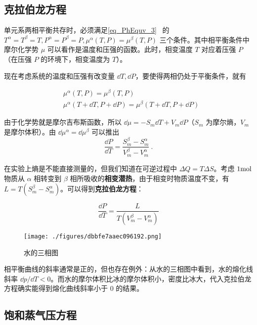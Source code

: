 
\begin{issues}
\issueDraft
\end{issues}


\subsection{克拉伯龙方程}
单元系两相平衡共存时，必须满足\autoref{eq_PhEquv_3}~ 的 $T^\alpha=T^\beta=T,P^\alpha=P^\beta=P,\mu^\alpha(T,P)=\mu^\beta(T,P)$ 三个条件。其中相平衡条件中摩尔化学势 $\mu$ 可以看作是温度和压强的函数。此时，相变温度 $T$ 对应着压强 $P$（在压强 $P$ 的环境下，相变温度为 $T$）。

现在考虑系统的温度和压强有改变量 $\dd T,\dd P$，要使得两相仍处于平衡条件，就有

\begin{align}
&\mu^\alpha(T,P)=\mu^\beta(T,P)\\
&\mu^\alpha(T+\dd T,P+\dd P)=\mu^\beta(T+\dd T,P+\dd P)
\end{align}

由于化学势就是摩尔吉布斯函数，所以 $\dd\mu=-S_m\dd T+V_m\dd P$（$S_m$ 为摩尔熵，$V_m$ 是摩尔体积）。由 $\dd \mu^\alpha=\dd \mu^\beta$ 可以推出
\begin{equation}
\frac{\dd P}{\dd T}=\frac{S^\beta_m-S^\alpha_m}{V^\beta_m-V^\alpha_m}~.
\end{equation}

在实验上熵是不能直接测量的，但我们知道在可逆过程中 $\Delta Q=T\Delta S$。考虑 $1\rm mol$ 物质从 $\alpha$ 相转变到 $\beta$ 相所吸收的\textbf{相变潜热}，由于相变时物质温度不变，有 $L=T(S_m^\beta-S_m^\alpha)$。可以得到\textbf{克拉伯龙方程}：

\begin{equation}\label{eq_Clapey_1}
\frac{\dd P}{\dd T}=\frac{L}{T(V^\beta_m-V^\alpha_m)}
\end{equation}
\begin{figure}[ht]
\centering
\texttt{[image: ./figures/dbbfe7aaec096192.png]}
\caption{水的三相图} \label{fig_Clapey_1}
\end{figure}

相平衡曲线的斜率通常是正的，但也存在例外：从水的三相图中看到，水的熔化线斜率 $\dd p/\dd T<0$。而水的摩尔体积比冰的摩尔体积小，密度比冰大，代入克拉伯龙方程确实能得到熔化曲线斜率小于 $0$ 的结果。

\subsection{饱和蒸气压方程}

